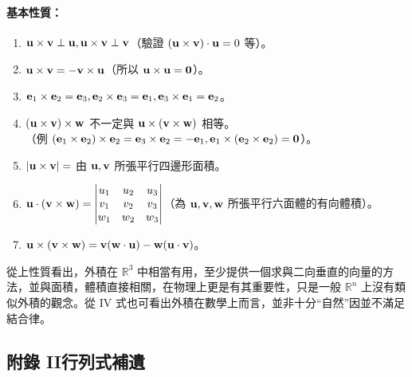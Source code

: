 \paragraph{基本性質：}
\begin{enumerate}[label=\Roman*., leftmargin=2.5em]
  \item $\vect{u} \times \vect{v} \perp \vect{u}, \vect{u} \times \vect{v} \perp \vect{v}$（驗證 $(\vect{u} \times \vect{v}) \cdot \vect{u} = 0$ 等）。
  \item $\vect{u} \times \vect{v} = - \vect{v} \times \vect{u}$（所以 $\vect{u} \times \vect{u} = \vect{0}$）。
  \item $\vect{e}_1 \times \vect{e}_2 = \vect{e}_3, \vect{e}_2 \times \vect{e}_3 = \vect{e}_1, \vect{e}_3 \times \vect{e}_1 = \vect{e}_2$。
  \item $(\vect{u} \times \vect{v}) \times \vect{w}$ 不一定與 $\vect{u} \times (\vect{v} \times \vect{w})$ 相等。\\
  （例 $(\vect{e}_1 \times \vect{e}_2) \times \vect{e}_2 = \vect{e}_3 \times \vect{e}_2 = -\vect{e}_1, \vect{e}_1 \times (\vect{e}_2 \times \vect{e}_2) = \vect{0}$）。
  \item $|\vect{u} \times \vect{v}| = $ 由 $\vect{u}, \vect{v}$ 所張平行四邊形面積。
  \item $\vect{u} \cdot (\vect{v} \times \vect{w}) = \begin{vmatrix}
  u_1 & u_2 & u_3 \\
  v_1 & v_2 & v_3 \\
  w_1 & w_2 & w_3
  \end{vmatrix}$（為 $\vect{u}, \vect{v}, \vect{w}$ 所張平行六面體的有向體積）。
  \item $\vect{u} \times (\vect{v} \times \vect{w}) = \vect{v}(\vect{w} \cdot \vect{u}) - \vect{w}(\vect{u} \cdot \vect{v})$。
\end{enumerate}

從上性質看出，外積在 $\mathbb{R}^3$ 中相當有用，至少提供一個求與二向垂直的向量的方法，並與面積，體積直接相關，在物理上更是有其重要性，只是一般 $\mathbb{R}^n$ 上沒有類似外積的觀念。從 IV 式也可看出外積在數學上而言，並非十分“自然”因並不滿足結合律。

\subsection*{附錄 II\quad 行列式補遺}\label{sec:b6s-app2}
\resetsectcounters

